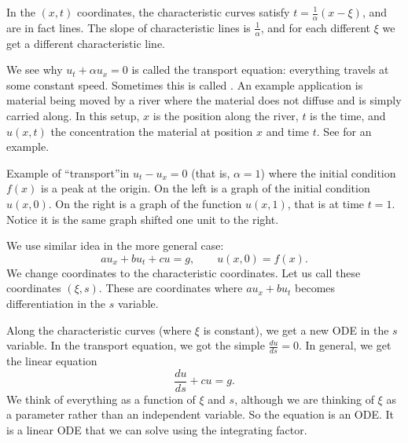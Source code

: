\documentclass{ximera}
\begin{document}
\begin{exampleSol}
    In the $(x,t)$ coordinates, the characteristic curves satisfy $t = \frac{1}{\alpha} ( x- \xi)$, and are in fact lines. The slope of characteristic lines is $\frac{1}{\alpha}$, and for each different $\xi$ we get a different characteristic line.
    
    We see why $u_t + \alpha u_x = 0$ is called the transport equation: everything travels at some constant speed. Sometimes this is called \emph{}. An example application is material being moved by a river where the material does not diffuse and is simply carried along.  In this setup, $x$ is the position along the river, $t$ is the time, and $u(x,t)$ the concentration the material at position $x$ and time $t$.  See  for an example.
    \begin{myfig}
        \capstart
        \caption{Example of ``transport''in $u_t-u_x = 0$ (that is, $\alpha = 1$) where the initial condition $f(x)$ is a peak at the origin.  On the left is a graph of the initial condition $u(x,0)$.  On the right is a graph of the function $u(x,1)$, that is at time $t=1$.  Notice it is the same graph shifted one unit to the right.\label{fopde:transportfig}}
    \end{myfig}
\end{exampleSol}

We use similar idea in the more general case:
\begin{equation*}
    a u_x + b u_t + c u = g, \qquad u(x,0) = f(x)  .
\end{equation*}
We change coordinates to the characteristic coordinates. Let us call these coordinates $(\xi,s)$. These are coordinates where $a u_x + b u_t$ becomes differentiation in the $s$ variable.

Along the characteristic curves (where $\xi$ is constant), we get a new ODE in the $s$ variable.  In the transport equation, we got the simple $\frac{du}{ds} = 0$.  In general, we get the linear equation
\begin{equation} \label{eq:fopde:charode}
    \frac{du}{ds} + c u = g.
\end{equation}
We think of everything as a function of $\xi$ and $s$, although we are thinking of $\xi$ as a parameter rather than an independent variable. So the equation is an ODE\@.  It is a linear ODE that we can solve using the integrating factor.
\end{document}
